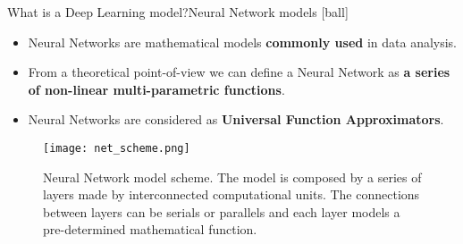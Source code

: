 \documentclass[10pt, technote, oribibl, unicode]{beamer}
\begin{document}
\begin{frame}{What is a Deep Learning model?}{Neural Network models}
  [ball]

  \begin{itemize}
    \item Neural Networks are mathematical models \textbf{commonly used} in data analysis.

    \item From a theoretical point-of-view we can define a Neural Network as \textbf{a series of non-linear multi-parametric functions}.

    \item Neural Networks are considered as \textbf{Universal Function Approximators}.
  \end{itemize}

  \begin{figure}[hbp]
    \centering
    \texttt{[image: net\_scheme.png]}
    \caption{\scriptsize{Neural Network model scheme.
             The model is composed by a series of layers made by interconnected computational units.
             The connections between layers can be serials or parallels and each layer models a pre-determined mathematical function.
            }}
  \end{figure}

\end{frame}
\end{document}
